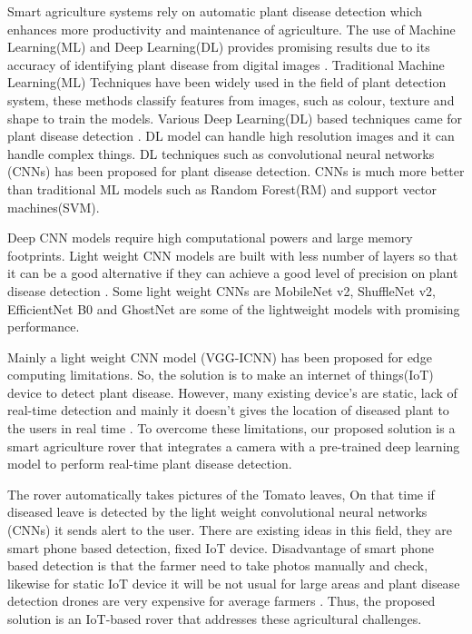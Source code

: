 \documentclass[pdflatex,sn-mathphys-num,iicol]{sn-jnl} %
\theoremstyle{thmstyleone}
\theoremstyle{thmstyletwo}
\theoremstyle{thmstylethree}
\begin{document}
Smart agriculture systems rely on automatic plant disease detection which enhances more productivity and maintenance of agriculture. The use of Machine Learning(ML) and Deep Learning(DL) provides promising results due to its accuracy of identifying plant disease from digital images \cite{5}. Traditional Machine Learning(ML) Techniques have been widely used in the field of plant detection system, these methods classify features from images, such as colour, texture and shape to train the models. Various Deep Learning(DL) based techniques came for plant disease detection \cite{6}. DL model can handle high resolution images and it can handle complex things. DL techniques such as convolutional neural networks (CNNs) has been proposed for plant disease detection. CNNs is much more better than traditional ML models such as Random Forest(RM) and support vector machines(SVM)\cite{7}.

Deep CNN models require high computational powers and large memory footprints. Light weight CNN models are built with less number of layers so that it can be a good alternative if they can achieve a good level of precision on plant disease detection \cite{8}. Some light weight CNNs are MobileNet v2, ShuffleNet v2, EfficientNet B0 and GhostNet are some of the lightweight models with promising performance.

Mainly a light weight CNN model (VGG-ICNN) has been proposed for edge computing limitations. So, the solution is to make an internet of things(IoT) device to detect plant disease. However, many existing device’s are static, lack of real-time detection and mainly it doesn’t gives the location of diseased plant to the users in real time \cite{9}. To overcome these limitations, our proposed solution is a smart agriculture rover that integrates a camera with a pre-trained deep learning model to perform real-time plant disease detection.

The rover automatically takes pictures of the Tomato leaves, On that time if diseased leave is detected by the light weight convolutional neural networks (CNNs) it sends alert to the user. There are existing ideas in this field, they are smart phone based detection, fixed IoT device\cite{5}. Disadvantage of smart phone based detection is that the farmer need to take photos manually and check, likewise for static IoT device it will be not usual for large areas and plant disease detection drones are very expensive for average farmers \cite{9}. Thus, the proposed solution is an IoT-based rover that addresses these agricultural challenges.
\end{document}
